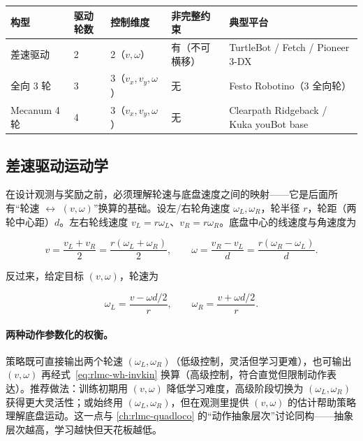 \begin{center}
\small
\begin{tabular}{@{}lllll@{}}
\toprule
构型 & 驱动轮数 & 控制维度 & 非完整约束 & 典型平台 \\
\midrule
差速驱动 & 2 & 2（$v,\omega$） & 有（不可横移） & TurtleBot / Fetch / Pioneer 3-DX \\
全向 3 轮 & 3 & 3（$v_x,v_y,\omega$） & 无 & Festo Robotino（3 全向轮） \\
Mecanum 4 轮 & 4 & 3（$v_x,v_y,\omega$） & 无 & Clearpath Ridgeback / Kuka youBot base \\
\bottomrule
\end{tabular}
\end{center}

\subsection{差速驱动运动学}
\label{sec:rlmc-wh-kinematics}

在设计观测与奖励之前，必须理解轮速与底盘速度之间的映射——它是后面所有“轮速 $\leftrightarrow$ $(v,\omega)$”换算的基础。设左/右轮角速度 $\omega_L,\omega_R$，轮半径 $r$，轮距（两轮中心距）$d$。左右轮线速度 $v_L=r\omega_L$、$v_R=r\omega_R$。底盘中心的线速度与角速度为

\begin{equation}
v=\frac{v_L+v_R}{2}=\frac{r(\omega_L+\omega_R)}{2},\qquad
\omega=\frac{v_R-v_L}{d}=\frac{r(\omega_R-\omega_L)}{d}.
\label{eq:rlmc-wh-fwdkin}
\end{equation}

反过来，给定目标 $(v,\omega)$，轮速为

\begin{equation}
\omega_L=\frac{v-\omega d/2}{r},\qquad \omega_R=\frac{v+\omega d/2}{r}.
\label{eq:rlmc-wh-invkin}
\end{equation}

\paragraph{两种动作参数化的权衡。}策略既可直接输出两个轮速 $(\omega_L,\omega_R)$（低级控制，灵活但学习更难），也可输出 $(v,\omega)$ 再经式~\eqref{eq:rlmc-wh-invkin} 换算（高级控制，符合直觉但限制动作表达）。推荐做法：训练初期用 $(v,\omega)$ 降低学习难度，高级阶段切换为 $(\omega_L,\omega_R)$ 获得更大灵活性；或始终用 $(\omega_L,\omega_R)$，但在观测里提供 $(v,\omega)$ 的估计帮助策略理解底盘运动。这一点与 \cref{ch:rlmc-quadloco} 的“动作抽象层次”讨论同构——抽象层次越高，学习越快但天花板越低。

